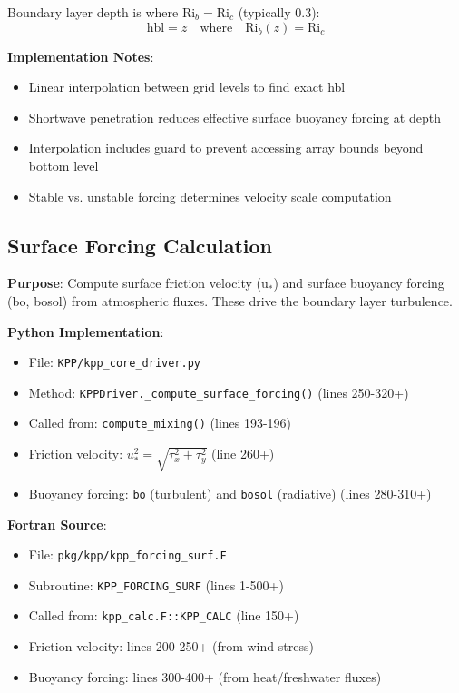 \documentclass[11pt]{article}
\begin{document}
Boundary layer depth is where $\text{Ri}_b = \text{Ri}_c$ (typically 0.3):
\begin{equation}
\text{hbl} = z \quad \text{where} \quad \text{Ri}_b(z) = \text{Ri}_c
\end{equation}

\textbf{Implementation Notes}:
\begin{itemize}
    \item Linear interpolation between grid levels to find exact hbl
    \item Shortwave penetration reduces effective surface buoyancy forcing at depth
    \item Interpolation includes guard to prevent accessing array bounds beyond bottom level
    \item Stable vs. unstable forcing determines velocity scale computation
\end{itemize}

\subsection{Surface Forcing Calculation}

\textbf{Purpose}: Compute surface friction velocity (u$_*$) and surface buoyancy forcing (bo, bosol) from atmospheric fluxes. These drive the boundary layer turbulence.

\textbf{Python Implementation}:
\begin{itemize}
    \item File: \verb|KPP/kpp_core_driver.py|
    \item Method: \verb|KPPDriver._compute_surface_forcing()| (lines 250-320+)
    \item Called from: \verb|compute_mixing()| (lines 193-196)
    \item Friction velocity: $u_*^2 = \sqrt{\tau_x^2 + \tau_y^2}$ (line 260+)
    \item Buoyancy forcing: \verb|bo| (turbulent) and \verb|bosol| (radiative) (lines 280-310+)
\end{itemize}

\textbf{Fortran Source}:
\begin{itemize}
    \item File: \verb|pkg/kpp/kpp_forcing_surf.F|
    \item Subroutine: \verb|KPP_FORCING_SURF| (lines 1-500+)
    \item Called from: \verb|kpp_calc.F::KPP_CALC| (line 150+)
    \item Friction velocity: lines 200-250+ (from wind stress)
    \item Buoyancy forcing: lines 300-400+ (from heat/freshwater fluxes)
\end{itemize}
\end{document}
